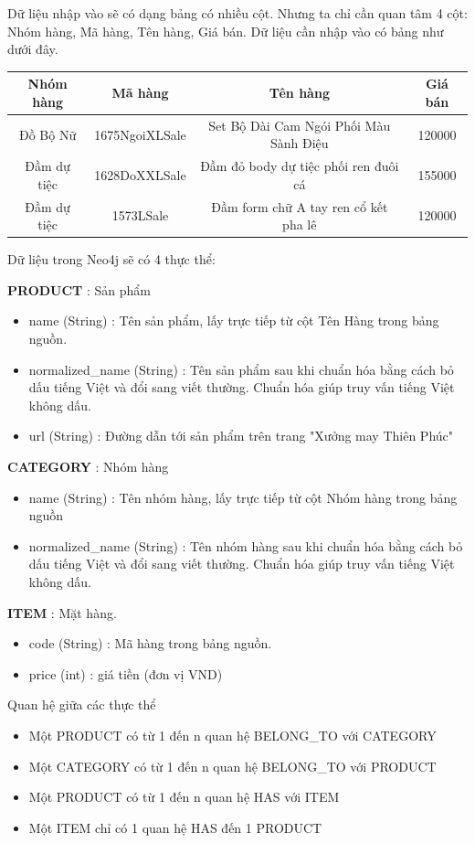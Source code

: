 Dữ liệu nhập vào sẽ có dạng bảng có nhiều cột. Nhưng ta chỉ cần quan tâm 4 cột: Nhóm hàng, Mã hàng, Tên hàng, Giá bán. Dữ liệu cần nhập vào có bảng như dưới đây.

\begin{center}
 \begin{tabular}{||c c c c||} 
 \hline
 Nhóm hàng & Mã hàng & Tên hàng & Giá bán \\ [0.5ex] 
 \hline\hline
 Đồ Bộ Nữ & 1675NgoiXLSale & Set Bộ Dài Cam Ngói Phối Màu Sành Điệu & 120000 \\ 
 \hline
 Đầm dự tiệc & 1628DoXXLSale & Đầm đỏ body dự tiệc phối ren đuôi cá & 155000 \\
 \hline
  Đầm dự tiệc & 1573LSale & Đầm form chữ A tay ren cổ kết pha lê  & 120000 \\ [1ex] 
 \hline
\end{tabular}
\end{center}

Dữ liệu trong Neo4j sẽ có 4 thực thể: \pagebreak

\textbf{PRODUCT} : Sản phẩm 
\begin{itemize}
\item name (String) : Tên sản phẩm, lấy trực tiếp từ cột Tên Hàng trong bảng nguồn. 
\item normalized\_name (String) : Tên sản phẩm sau khi chuẩn hóa bằng cách bỏ dấu tiếng Việt và đổi sang viết thường. Chuẩn hóa giúp truy vấn tiếng Việt không dấu. 
\item url (String) : Đường dẫn tới sản phẩm trên trang "Xưởng may Thiên Phúc" 
\end{itemize}


\textbf{CATEGORY} : Nhóm hàng 
\begin{itemize}
\item name (String) : Tên nhóm hàng, lấy trực tiếp từ cột Nhóm hàng trong bảng nguồn
\item normalized\_name (String) : Tên nhóm hàng sau khi chuẩn hóa bằng cách bỏ dấu tiếng Việt và đổi sang viết thường. Chuẩn hóa giúp truy vấn tiếng Việt không dấu. 
\end{itemize}

\textbf{ITEM} : Mặt hàng. 
\begin{itemize}
\item code (String) : Mã hàng trong bảng nguồn. 
\item price (int) : giá tiền (đơn vị VND)  
\end{itemize}

Quan hệ giữa các thực thể 
\begin{itemize}
\item Một PRODUCT có từ 1 đến n quan hệ BELONG\_TO với CATEGORY
\item Một CATEGORY có từ 1 đến n quan hệ BELONG\_TO với PRODUCT
\item Một PRODUCT có từ 1 đến n quan hệ HAS với ITEM 
\item Một ITEM chỉ có 1 quan hệ HAS đến 1 PRODUCT 
\end{itemize}


